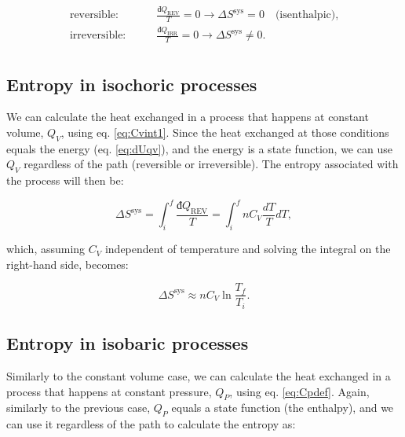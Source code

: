 \documentclass[
]{book}
\theoremstyle{definition}
\theoremstyle{definition}
\theoremstyle{definition}
\theoremstyle{remark}
\begin{document}
\begin{equation}
\begin{aligned}
\text{reversible:} \qquad & \frac{đQ_{\mathrm{REV}}}{T} = 0 \longrightarrow \Delta S^{\mathrm{sys}} = 0 \quad \text{(isenthalpic),}\\
\text{irreversible:} \qquad & \frac{đQ_{\mathrm{IRR}}}{T}  = 0 \longrightarrow \Delta S^{\mathrm{sys}} \neq 0. \\
\end{aligned}
\label{eq:adiabaticent}
\end{equation}

\hypertarget{entropy-in-isochoric-processes}{%
\subsection{Entropy in isochoric processes}\label{entropy-in-isochoric-processes}}

We can calculate the heat exchanged in a process that happens at constant volume, \(Q_V\), using eq. \eqref{eq:Cvint1}. Since the heat exchanged at those conditions equals the energy (eq. \eqref{eq:dUqv}), and the energy is a state function, we can use \(Q_V\) regardless of the path (reversible or irreversible). The entropy associated with the process will then be:

\begin{equation}
\Delta S^{\mathrm{sys}} = \int_i^f \frac{đQ_{\mathrm{REV}}}{T} = \int_i^f nC_V \frac{dT}{T} dT,
\label{eq:sconstV1}
\end{equation}

which, assuming \(C_V\) independent of temperature and solving the integral on the right-hand side, becomes:

\begin{equation}
\Delta S^{\mathrm{sys}} \approx n C_V \ln \frac{T_f}{T_i}.
\label{eq:sconstV}
\end{equation}

\hypertarget{entropy-in-isobaric-processes}{%
\subsection{Entropy in isobaric processes}\label{entropy-in-isobaric-processes}}

Similarly to the constant volume case, we can calculate the heat exchanged in a process that happens at constant pressure, \(Q_P\), using eq. \eqref{eq:Cpdef}. Again, similarly to the previous case, \(Q_P\) equals a state function (the enthalpy), and we can use it regardless of the path to calculate the entropy as:
\end{document}
